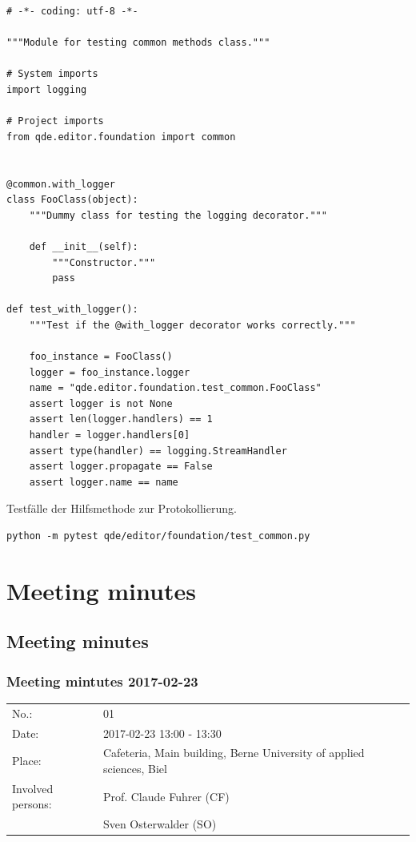 \documentclass[10pt, openright, notitlepage]{scrreprt}
\begin{document}
\begin{listing}[H]
\begin{verbatim}
# -*- coding: utf-8 -*-

"""Module for testing common methods class."""

# System imports
import logging

# Project imports
from qde.editor.foundation import common


@common.with_logger
class FooClass(object):
    """Dummy class for testing the logging decorator."""

    def __init__(self):
        """Constructor."""
        pass

def test_with_logger():
    """Test if the @with_logger decorator works correctly."""

    foo_instance = FooClass()
    logger = foo_instance.logger
    name = "qde.editor.foundation.test_common.FooClass"
    assert logger is not None
    assert len(logger.handlers) == 1
    handler = logger.handlers[0]
    assert type(handler) == logging.StreamHandler
    assert logger.propagate == False
    assert logger.name == name
\end{verbatim}
\caption{\label{fig:editor-common-logging-test}
Testfälle der Hilfsmethode zur Protokollierung.}
\end{listing}

\begin{verbatim}
python -m pytest qde/editor/foundation/test_common.py
\end{verbatim}
\section{Meeting minutes}
\label{sec:org678e9cc}
\subsection{Meeting minutes}
\label{sec:org52b6b0d}

\subsubsection{Meeting mintutes 2017-02-23}
\label{sec:orgea7470a}

\begin{center}
\begin{tabular}{ll}
No.: & 01\\
Date: & 2017-02-23 13:00 - 13:30\\
Place: & Cafeteria, Main building, Berne University of applied sciences, Biel\\
Involved persons: & Prof. Claude Fuhrer (CF)\\
 & Sven Osterwalder (SO)\\
\end{tabular}
\end{center}
\end{document}
